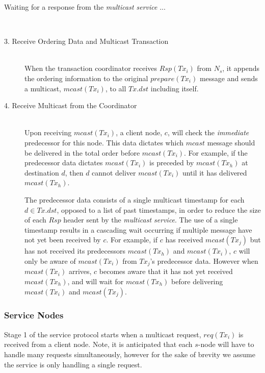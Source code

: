 \begin{description}
        \item[Waiting for a response from the \emph{multicast service} ...] \hfill \\
        
        \item[3. Receive Ordering Data and Multicast Transaction] \hfill \\
        When the transaction coordinator receives $Rsp(Tx_i)$ from $N_s$, it appends the ordering information to the original $prepare(Tx_i)$ message and sends a multicast, $mcast(Tx_i)$, to all $Tx.dst$ including itself. 
        
        \item[4. Receive Multicast from the Coordinator] \hfill \\
        Upon receiving $mcast(Tx_i)$, a client node, $c$, will check the \emph{immediate} predecessor for this node.  This data dictates which $mcast$ message should be delivered in the total order before $mcast(Tx_i)$.  For example, if the predecessor data dictates $mcast(Tx_i)$ is preceded by $mcast(Tx_h)$ at destination $d$, then $d$ cannot deliver $mcast(Tx_i)$ until it has delivered $mcast(Tx_h)$.  
        
        The predecessor data consists of a single multicast timestamp for each $d \in Tx.dst$, opposed to a list of past timestamps, in order to reduce the size of each $Rsp$ header sent by the \emph{multicast service}.  The use of a single timestamp results in a cascading wait occurring if multiple message have not yet been received by $c$.  For example, if $c$ has received $mcast(Tx_j)$ but has not received its predecessors $mcast(Tx_h)$ and $mcast(Tx_i)$, $c$ will only be aware of $mcast(Tx_i)$ from $Tx_j$'s predecessor data.  However when $mcast(Tx_i)$ arrives, $c$ becomes aware that it has not yet received $mcast(Tx_h)$,  and will wait for $mcast(Tx_h)$ before delivering $mcast(Tx_i)$ and $mcast(Tx_j)$.          
    \end{description}

    \subsubsection*{Service Nodes}
    Stage 1 of the service protocol starts when a multicast request, $req(Tx_i)$ is received from a client node.  Note, it is anticipated that each $s$-node will have to handle many requests simultaneously, however for the sake of brevity we assume the service is only handling a single request.  
    
